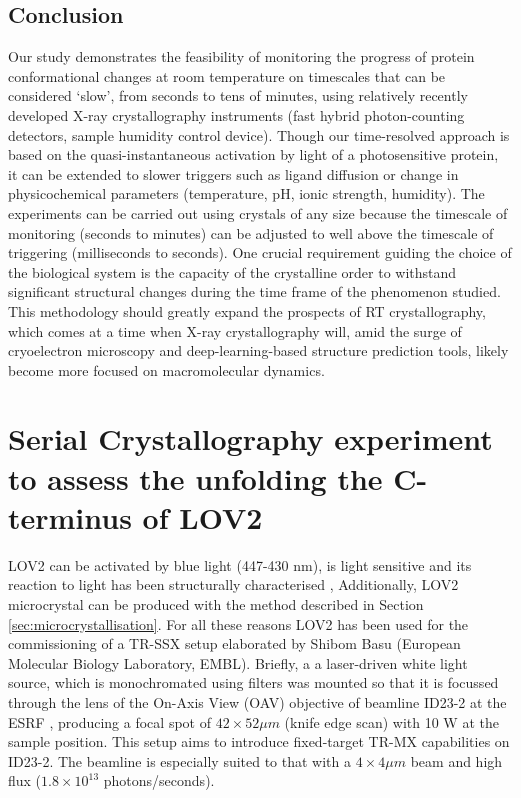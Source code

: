 \section{Conclusion}

Our study demonstrates the feasibility of monitoring the progress of protein conformational changes at room temperature on timescales that can be considered ‘slow’, from seconds to tens of minutes, using relatively recently developed X-ray crystallography instruments (fast hybrid photon-counting detectors, sample humidity control device). Though our time-resolved approach is based on the quasi-instantaneous activation by light of a photosensitive protein, it can be extended to slower triggers such as ligand diffusion or change in physicochemical parameters (temperature, pH, ionic strength, humidity). The experiments can be carried out using crystals of any size because the timescale of monitoring (seconds to minutes) can be adjusted to well above the timescale of triggering (milliseconds to seconds). One crucial requirement guiding the choice of the biological system is the capacity of the crystalline order to withstand significant structural changes during the time frame of the phenomenon studied. This methodology should greatly expand the prospects of RT crystallography, which comes at a time when X-ray crystallography will, amid the surge of cryoelectron microscopy and deep-learning-based structure prediction tools, likely become more focused on macromolecular dynamics.

\chapter{Serial Crystallography experiment to assess the unfolding the C-terminus of LOV2}\label{chap:SSX_LOV2}

LOV2 can be activated by blue light (447-430 nm), is light sensitive and its reaction to light has been structurally characterised \parencite{aumonierMillisecondTimeresolvedSerial2020}, Additionally, LOV2 microcrystal can be produced with the method described in Section \ref{sec:microcrystallisation}. For all these reasons LOV2 has been used for the commissioning of a TR-SSX setup elaborated by Shibom Basu (European Molecular Biology Laboratory, EMBL). Briefly, a  a laser-driven white light source, which is monochromated using filters was mounted so that it is focussed through the lens of the On-Axis View (OAV) objective of beamline ID23-2 at the ESRF \parencite{nanaoID232AutomatedHighperformance2022}, producing a focal spot of \(42 \times 52 \mu m\) (knife edge scan) with 10 \textmu W at the sample position. This setup aims to introduce fixed-target TR-MX capabilities on ID23-2. The beamline is especially suited to that with a \(4\times4 \mu m\) beam and high flux (\(1.8 \times 10^{13}\) photons/seconds). 

